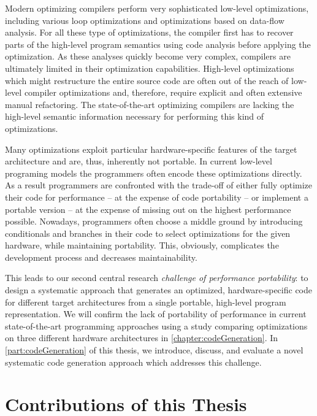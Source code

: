 Modern optimizing compilers perform very sophisticated low-level optimizations, including various loop optimizations and optimizations based on data-flow analysis.
For all these type of optimizations, the compiler first has to recover parts of the high-level program semantics using code analysis before applying the optimization.
As these analyses quickly become very complex, compilers are ultimately limited in their optimization capabilities.
High-level optimizations which might restructure the entire source code are often out of the reach of low-level compiler optimizations and, therefore, require explicit and often extensive manual refactoring.
The state-of-the-art optimizing compilers are lacking the high-level semantic information necessary for performing this kind of optimizations.

Many optimizations exploit particular hardware-specific features of the target architecture and are, thus, inherently not portable.
In current low-level programing models the programmers often encode these optimizations directly.
As a result programmers are confronted with the trade-off of either fully optimize their code for performance -- at the expense of code portability -- or implement a portable version -- at the expense of missing out on the highest performance possible.
Nowadays, programmers often choose a middle ground by introducing conditionals and branches in their code to select optimizations for the given hardware, while maintaining portability.
This, obviously, complicates the development process and decreases maintainability.

This leads to our second central research \emph{challenge of performance portability}:
to design a systematic approach that generates an optimized, hardware-specific code for different target architectures from a single portable, high-level program representation.
We will confirm the lack of portability of performance in current state-of-the-art programming approaches using a study comparing optimizations on three different hardware architectures in \autoref{chapter:codeGeneration}.
In \autoref{part:codeGeneration} of this thesis, we introduce, discuss, and evaluate a novel systematic code generation approach which addresses this challenge.


\section{Contributions of this Thesis}

